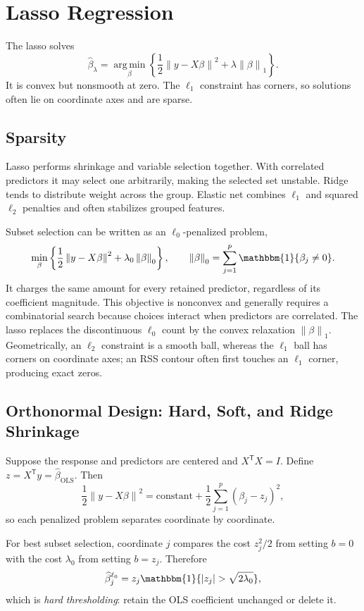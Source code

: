 \documentclass[12pt,oneside]{book}
\numberwithin{equation}{section}
\theoremstyle{definition}
\theoremstyle{plain}
\theoremstyle{remark}
\newcommand{\ind}{\mathbbm{1}}
\newcommand{\argmin}{\operatorname*{arg\,min}}
\newcommand{\norm}[1]{\left\lVert #1 \right\rVert}
\begin{document}
\section{Lasso Regression}

The lasso solves
\begin{equation}
 \widehat\beta_\lambda
 =\argmin_\beta\left\{\frac12\norm{y-X\beta}^2
 +\lambda\norm\beta_1\right\}.
 \label{eq:lasso-objective}
\end{equation}
It is convex but nonsmooth at zero. The $\ell_1$ constraint has corners, so
solutions often lie on coordinate axes and are sparse.

\subsection{Sparsity}

Lasso performs shrinkage and variable selection together. With correlated
predictors it may select one arbitrarily, making the selected set unstable.
Ridge tends to distribute weight across the group. Elastic net combines
$\ell_1$ and squared $\ell_2$ penalties and often stabilizes grouped features.

Subset selection can be written as an $\ell_0$-penalized problem,
\[
 \min_\beta\left\{\frac12\norm{y-X\beta}^2
 +\lambda_0\norm\beta_0\right\},
 \qquad
 \norm\beta_0=\sum_{j=1}^p\ind\{\beta_j\neq0\}.
\]
It charges the same amount for every retained predictor, regardless of its
coefficient magnitude. This objective is nonconvex and generally requires a
combinatorial search because choices interact when predictors are correlated.
The lasso replaces the discontinuous $\ell_0$ count by the convex relaxation
$\norm\beta_1$. Geometrically, an $\ell_2$ constraint is a smooth ball, whereas
the $\ell_1$ ball has corners on coordinate axes; an RSS contour often first
touches an $\ell_1$ corner, producing exact zeros.

\subsection{Orthonormal Design: Hard, Soft, and Ridge Shrinkage}

Suppose the response and predictors are centered and $X^\mathsf TX=I$. Define
$z=X^\mathsf Ty=\widehat\beta_{\mathrm{OLS}}$. Then
\[
 \frac12\norm{y-X\beta}^2
 =\text{constant}+\frac12\sum_{j=1}^p(\beta_j-z_j)^2,
\]
so each penalized problem separates coordinate by coordinate.

For best subset selection, coordinate $j$ compares the cost $z_j^2/2$ from
setting $b=0$ with the cost $\lambda_0$ from setting $b=z_j$. Therefore
\begin{equation}
 \widehat\beta_j^{\ell_0}
 =z_j\ind\{|z_j|>\sqrt{2\lambda_0}\},
 \label{eq:hard-threshold}
\end{equation}
which is \emph{hard thresholding}: retain the OLS coefficient unchanged or
delete it.
\end{document}

